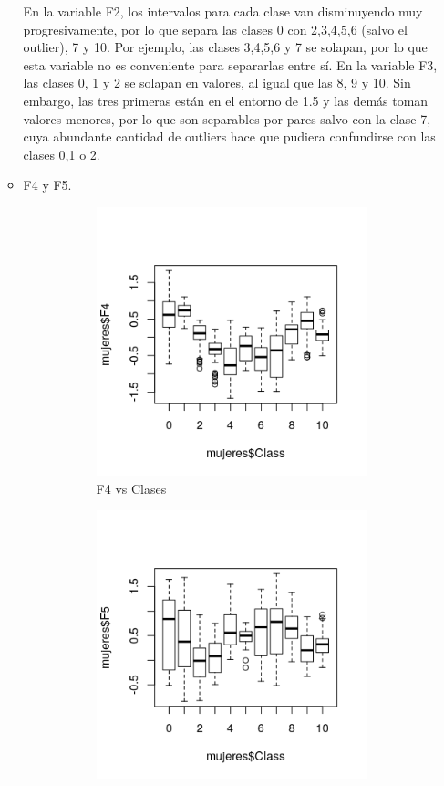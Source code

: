 \begin{itemize}
\begin{itemize}
		En la variable F2, los intervalos para cada clase van disminuyendo muy progresivamente, por lo que separa las clases 0 con 2,3,4,5,6 (salvo el outlier), 7 y 10. Por ejemplo, las clases 3,4,5,6 y 7 se solapan, por lo que esta variable no es conveniente para separarlas entre sí. En la variable F3, las clases 0, 1 y 2 se solapan en valores, al igual que las 8, 9 y 10. Sin embargo, las tres primeras están en el entorno de 1.5 y las demás toman valores menores, por lo que son separables por pares salvo con la clase 7, cuya abundante cantidad de outliers hace que pudiera confundirse con las clases 0,1 o 2.
		\newpage
		\item F4 y F5.
		
		\begin{figure}[H]
			\centering
			\begin{subfigure}{.5\textwidth}
				\centering
				\includegraphics[width=.8\linewidth]{bpmF4.png}
				\caption{F4 vs Clases}
				\label{fig:bpmF4}
			\end{subfigure}%
			\begin{subfigure}{.5\textwidth}
				\centering
				\includegraphics[width=.8\linewidth]{bpmF5.png}

\end{subfigure}
\end{figure}
\end{itemize}
\end{itemize}
